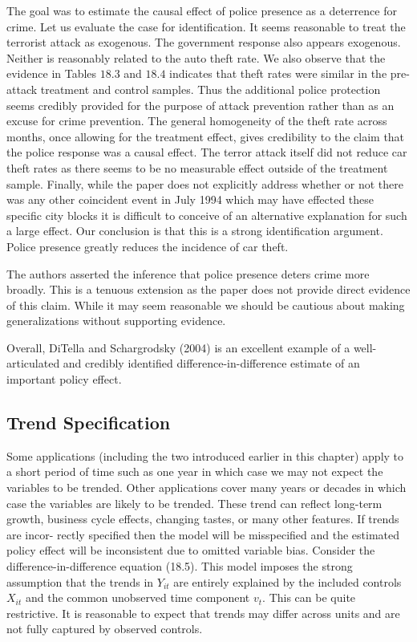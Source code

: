 \documentclass[10pt]{article}
\begin{document}
The goal was to estimate the causal effect of police presence as a deterrence for crime. Let us evaluate the case for identification. It seems reasonable to treat the terrorist attack as exogenous. The government response also appears exogenous. Neither is reasonably related to the auto theft rate. We also observe that the evidence in Tables $18.3$ and $18.4$ indicates that theft rates were similar in the pre-attack treatment and control samples. Thus the additional police protection seems credibly provided for the purpose of attack prevention rather than as an excuse for crime prevention. The general homogeneity of the theft rate across months, once allowing for the treatment effect, gives credibility to the claim that the police response was a causal effect. The terror attack itself did not reduce car theft rates as there seems to be no measurable effect outside of the treatment sample. Finally, while the paper does not explicitly address whether or not there was any other coincident event in July 1994 which may have effected these specific city blocks it is difficult to conceive of an alternative explanation for such a large effect. Our conclusion is that this is a strong identification argument. Police presence greatly reduces the incidence of car theft.

The authors asserted the inference that police presence deters crime more broadly. This is a tenuous extension as the paper does not provide direct evidence of this claim. While it may seem reasonable we should be cautious about making generalizations without supporting evidence.

Overall, DiTella and Schargrodsky (2004) is an excellent example of a well-articulated and credibly identified difference-in-difference estimate of an important policy effect.

\subsection{Trend Specification}
Some applications (including the two introduced earlier in this chapter) apply to a short period of time such as one year in which case we may not expect the variables to be trended. Other applications cover many years or decades in which case the variables are likely to be trended. These trend can reflect long-term growth, business cycle effects, changing tastes, or many other features. If trends are incor- rectly specified then the model will be misspecified and the estimated policy effect will be inconsistent due to omitted variable bias. Consider the difference-in-difference equation (18.5). This model imposes the strong assumption that the trends in $Y_{i t}$ are entirely explained by the included controls $X_{i t}$ and the common unobserved time component $v_{t}$. This can be quite restrictive. It is reasonable to expect that trends may differ across units and are not fully captured by observed controls.
\end{document}
